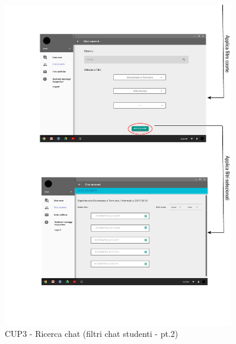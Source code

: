 \begin{figure}
	\centering
	\includegraphics[width=0.9\textwidth]{imgs/gruppo6/activities/act_cup3_filtro_chat_studenti2.pdf}
	\caption{CUP3 - Ricerca chat (filtri chat studenti - pt.2)}
	\label{fig:cup3-4}
\end{figure}

